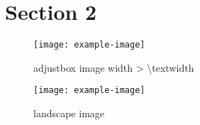 \documentclass[a4paper, english, final]{article}
\begin{document}
\section{Section 2}
\lipsum[1][1-5]

\begin{figure}[H]
    \centering
    \texttt{[image: example-image]}
    \caption{adjustbox image width > \textbackslash textwidth}
    \label{fig:id}
\end{figure}

{
\begin{landscape}
    \begin{figure}
        \texttt{[image: example-image]}
        \caption{landscape image}
        \label{fig:id2}
    \end{figure}
\end{landscape}
\restoregeometry
\clearpage
}

{
\newpage
\nocite{*} %
\printbibliography[heading=bibnumbered,title={Bibliography}]
}
\end{document}
